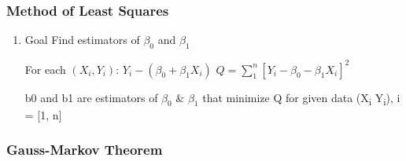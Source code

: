 \documentclass[11pt]{article}
\begin{document}
\subsubsection{Method of Least Squares}
\label{sec:orgb73b31f}
\begin{enumerate}
\item Goal
\label{sec:org3e3b709}
Find estimators of \(\beta_0\) and \(\beta_1\)

For each \((X_i, Y_i)\): \(Y_i - (\beta_0 + \beta_1 X_i)\)
\(Q = \sum_{1}^{n} [ Y_i - \beta_0 - \beta_1 X_i ]^2\)

b0 and b1 are estimators of \(\beta_0\) \& \(\beta_1\) that minimize Q for given data
(X\textsubscript{i} Y\textsubscript{i}), i = [1, n]
\end{enumerate}
\subsubsection{Gauss-Markov Theorem}
\label{sec:orgd117449}
\end{document}
